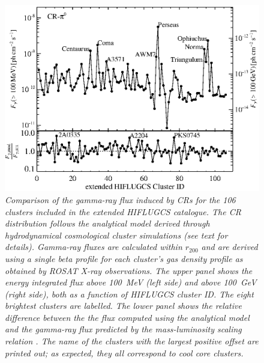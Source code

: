 \documentclass[10pt,aps,pra,reprint,amsmath,amsfonts,amssymb,showpacs,nofootinbib,floatfix]{revtex4-1}
\newcommand{\rvir}{r_{200}}
\begin{document}
\begin{figure}%
\begin{minipage}{2.0\columnwidth}
 \includegraphics[width=0.99\columnwidth]{figures/Flux.comp.CR.eps}
 \caption{\it Comparison of the gamma-ray flux induced by CRs for the
   106 clusters included in the extended HIFLUGCS catalogue.  The CR
   distribution follows the analytical model derived through
   hydrodynamical cosmological cluster simulations \protect
   \cite{2010MNRAS.409..449P} (see text for details).  Gamma-ray
   fluxes are calculated within $\rvir$ and are derived using a single
   beta profile for each cluster's gas density profile as obtained by
   ROSAT X-ray observations. The upper panel shows the energy
   integrated flux above 100~MeV (left side) and above 100~GeV (right
   side), both as a function of HIFLUGCS cluster ID. The eight
   brightest clusters are labelled. The lower panel shows the relative
   difference between the the flux computed using the analytical model
   and the gamma-ray flux predicted by the mass-luminosity scaling
   relation \cite{2010MNRAS.409..449P}. The name of the clusters with
   the largest positive offset are printed out; as expected, they all
   correspond to cool core clusters.}
 \label{fig19}
\end{minipage}
\end{figure}
\end{document}
